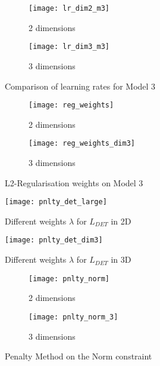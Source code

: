 
\label{appendix}

\begin{figure}
	\centering
	\begin{subfigure}{.5\textwidth}
		\centering
		\texttt{[image: lr\_dim2\_m3]}
		\caption{2 dimensions}
	\end{subfigure}%
	\begin{subfigure}{.5\textwidth}
		\centering
		\texttt{[image: lr\_dim3\_m3]}
		\caption{3 dimensions}
	\end{subfigure}
	\caption{Comparison of learning rates for Model 3}
	\label{fig:comp_lr_m3}
\end{figure}

\begin{figure}
	\centering
	\begin{subfigure}{.5\textwidth}
		\centering
		\texttt{[image: reg\_weights]}
		\caption{2 dimensions}
	\end{subfigure}%
	\begin{subfigure}{.5\textwidth}
		\centering
		\texttt{[image: reg\_weights\_dim3]}
		\caption{3 dimensions}
	\end{subfigure}
	\caption{L2-Regularisation weights on Model 3}
	\label{fig:reg_weights}
\end{figure}


\begin{figure}[ht]
	\centering
	\texttt{[image: pnlty\_det\_large]}
	\caption{Different weights $\lambda$ for $L_{DET}$ in 2D}
	\label{fig:pnlty_det_large}
\end{figure}

\begin{figure}[ht]
	\centering
	\texttt{[image: pnlty\_det\_dim3]}
	\caption{Different weights $\lambda$ for $L_{DET}$ in 3D}
	\label{fig:pnlty_det_dim3}
\end{figure}

\begin{figure}
	\centering
	\begin{subfigure}{.5\textwidth}
		\centering
		\texttt{[image: pnlty\_norm]}
		\caption{2 dimensions}
	\end{subfigure}%
	\begin{subfigure}{.5\textwidth}
		\centering
		\texttt{[image: pnlty\_norm\_3]}
		\caption{3 dimensions}
	\end{subfigure}
	\caption{Penalty Method on the Norm constraint}
	\label{fig:pnlny_norm}
\end{figure}


